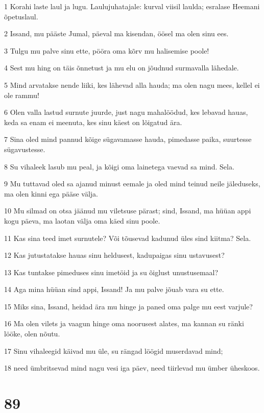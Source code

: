 \par 1 Korahi laste laul ja lugu. Laulujuhatajale: kurval viisil laulda; esralase Heemani õpetuslaul.
\par 2 Issand, mu pääste Jumal, päeval ma kisendan, öösel ma olen sinu ees.
\par 3 Tulgu mu palve sinu ette, pööra oma kõrv mu halisemise poole!
\par 4 Sest mu hing on täis õnnetust ja mu elu on jõudnud surmavalla lähedale.
\par 5 Mind arvatakse nende liiki, kes lähevad alla hauda; ma olen nagu mees, kellel ei ole rammu!
\par 6 Olen valla lastud surnute juurde, just nagu mahalöödud, kes lebavad hauas, keda sa enam ei meenuta, kes sinu käest on lõigatud ära.
\par 7 Sina oled mind pannud kõige sügavamasse hauda, pimedasse paika, suurtesse sügavustesse.
\par 8 Su vihaleek lasub mu peal, ja kõigi oma lainetega vaevad sa mind. Sela.
\par 9 Mu tuttavad oled sa ajanud minust eemale ja oled mind teinud neile jäleduseks, ma olen kinni ega pääse välja.
\par 10 Mu silmad on otsa jäänud mu viletsuse pärast; sind, Issand, ma hüüan appi kogu päeva, ma laotan välja oma käed sinu poole.
\par 11 Kas sina teed imet surnutele? Või tõusevad kadunud üles sind kiitma? Sela.
\par 12 Kas jutustatakse hauas sinu heldusest, kadupaigas sinu ustavusest?
\par 13 Kas tuntakse pimeduses sinu imetöid ja su õiglust unustusemaal?
\par 14 Aga mina hüüan sind appi, Issand! Ja mu palve jõuab vara su ette.
\par 15 Miks sina, Issand, heidad ära mu hinge ja paned oma palge mu eest varjule?
\par 16 Ma olen vilets ja vaagun hinge oma noorusest alates, ma kannan su ränki lööke, olen nõutu.
\par 17 Sinu vihaleegid käivad mu üle, su rängad löögid muserdavad mind;
\par 18 need ümbritsevad mind nagu vesi iga päev, need tiirlevad mu ümber üheskoos.

\chapter{89}

